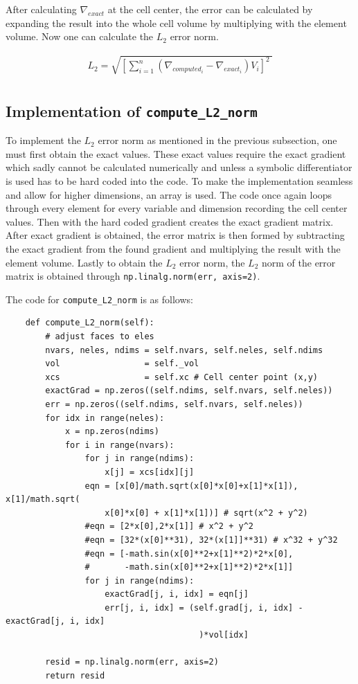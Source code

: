 \documentclass[a4paper, 12pt]{article}
\begin{document}
After calculating \(\nabla_{exact}\) at the cell center, the error can be calculated by expanding the result into the whole cell volume by multiplying with the element volume. Now one can calculate the \(L_{2}\) error norm.

\begin{equation}
\begin{matrix}
L_{2} = \sqrt{\left\lbrack \displaystyle\sum_{i = 1}^{n}\left( \nabla_{computed_{i}} - \nabla_{exact_{i}} \right)V_{i} \right\rbrack^{2}\ } \\
\end{matrix}
\end{equation}
\subsection{Implementation of \texttt{compute\_L2\_norm}}
To implement the $L_2$ error norm as mentioned in the previous subsection, one must first obtain the exact values. These exact values require the exact gradient which sadly cannot be calculated numerically and unless a symbolic differentiator is used has to be hard coded into the code. To make the implementation seamless and allow for higher dimensions, an array is used. The code once again loops through every element for every variable and dimension recording the cell center values. Then with the hard coded gradient creates the exact gradient matrix. After exact gradient is obtained, the error matrix is then formed by subtracting the exact gradient from the found gradient and multiplying the result with the element volume. Lastly to obtain the $L_2$ error norm, the $L_2$ norm of the error matrix is obtained through \verb|np.linalg.norm(err, axis=2)|.\\\par
The code for \verb|compute_L2_norm| is as follows:
\begin{verbatim}
    def compute_L2_norm(self):
        # adjust faces to eles
        nvars, neles, ndims = self.nvars, self.neles, self.ndims
        vol                 = self._vol
        xcs                 = self.xc # Cell center point (x,y)
        exactGrad = np.zeros((self.ndims, self.nvars, self.neles))
        err = np.zeros((self.ndims, self.nvars, self.neles))
        for idx in range(neles):
            x = np.zeros(ndims)
            for i in range(nvars):
                for j in range(ndims):
                    x[j] = xcs[idx][j]
                eqn = [x[0]/math.sqrt(x[0]*x[0]+x[1]*x[1]), x[1]/math.sqrt(
                    x[0]*x[0] + x[1]*x[1])] # sqrt(x^2 + y^2)
                #eqn = [2*x[0],2*x[1]] # x^2 + y^2
                #eqn = [32*(x[0]**31), 32*(x[1]]**31) # x^32 + y^32
                #eqn = [-math.sin(x[0]**2+x[1]**2)*2*x[0],
                #       -math.sin(x[0]**2+x[1]**2)*2*x[1]]
                for j in range(ndims):
                    exactGrad[j, i, idx] = eqn[j]
                    err[j, i, idx] = (self.grad[j, i, idx] - exactGrad[j, i, idx]
                                       )*vol[idx]

        resid = np.linalg.norm(err, axis=2)
        return resid
\end{verbatim}
\end{document}
